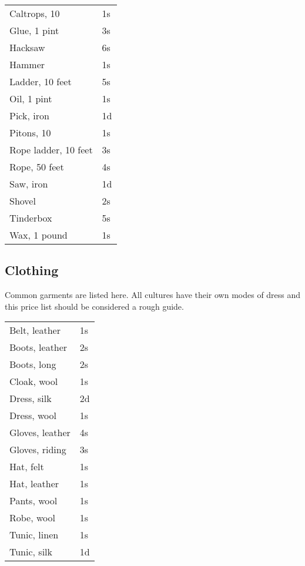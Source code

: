 \begin{center}
{
\begin{xtabular}{|l|l|}
Caltrops, 10 & 1s \\
Glue, 1 pint & 3s \\
Hacksaw & 6s \\
Hammer & 1s \\
Ladder, 10 feet & 5s \\
Oil, 1 pint & 1s \\
Pick, iron & 1d \\
Pitons, 10 & 1s \\
Rope ladder, 10 feet & 3s \\
Rope, 50 feet & 4s \\
Saw, iron & 1d \\
Shovel & 2s \\
Tinderbox & 5s \\
Wax, 1 pound & 1s \\
\hline
\end{xtabular}
}
\end{center}

\subsection{Clothing}

Common garments are listed here. All cultures have their own modes of dress and this price list should be considered a rough guide.

\begin{center}
{
\begin{xtabular}{|l|l|}
Belt, leather & 1s \\
Boots, leather & 2s \\
Boots, long & 2s \\
Cloak, wool & 1s \\
Dress, silk & 2d \\
Dress, wool & 1s \\
Gloves, leather & 4s \\
Gloves, riding & 3s \\
Hat, felt & 1s \\
Hat, leather & 1s \\
Pants, wool & 1s \\
Robe, wool & 1s \\
Tunic, linen & 1s \\
Tunic, silk & 1d \\
\hline
\end{xtabular}
}
\end{center}

